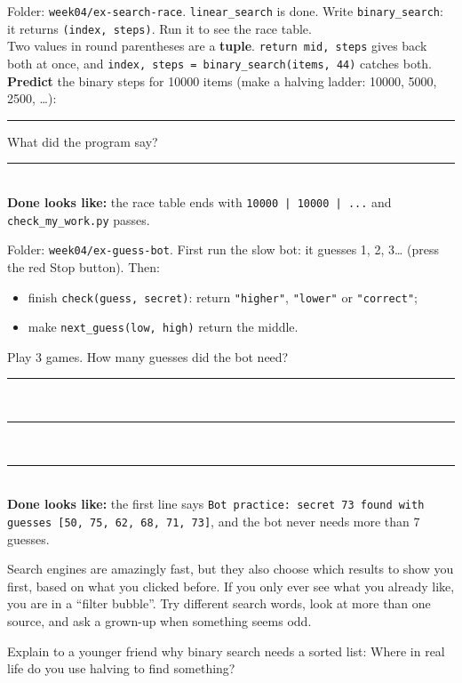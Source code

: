 \begin{exercise}
Folder: \texttt{week04/ex-search-race}. \texttt{linear\_search} is done. Write \texttt{binary\_search}: it returns \texttt{(index, steps)}. Run it to see the race table.\\
Two values in round parentheses are a \textbf{tuple}. \texttt{return mid, steps} gives back both at once, and \texttt{index, steps = binary\_search(items, 44)} catches both.\\
\textbf{Predict} the binary steps for 10000 items (make a halving ladder: 10000, 5000, 2500, \ldots): \rule{2cm}{0.4pt}\quad What did the program say? \rule{2cm}{0.4pt}\\
\textbf{Done looks like:} the race table ends with \texttt{10000 | 10000 | ...} and \texttt{check\_my\_work.py} passes.
\end{exercise}

\begin{exercise}
Folder: \texttt{week04/ex-guess-bot}. First run the slow bot: it guesses 1, 2, 3\ldots{} (press the red Stop button). Then:
\begin{itemize}[itemsep=1pt]
  \item finish \texttt{check(guess, secret)}: return \texttt{"higher"}, \texttt{"lower"} or \texttt{"correct"};
  \item make \texttt{next\_guess(low, high)} return the middle.
\end{itemize}
Play 3 games. How many guesses did the bot need? \rule{1.5cm}{0.4pt}\ \rule{1.5cm}{0.4pt}\ \rule{1.5cm}{0.4pt}\\
\textbf{Done looks like:} the first line says \texttt{Bot practice: secret 73 found with guesses [50, 75, 62, 68, 71, 73]}, and the bot never needs more than 7 guesses.
\end{exercise}

\begin{tip}
Search engines are amazingly fast, but they also choose which results to show you first, based on what you clicked before. If you only ever see what you already like, you are in a \enquote{filter bubble}. Try different search words, look at more than one source, and ask a grown-up when something seems odd.
\end{tip}

\begin{vocab}
\end{vocab}

\begin{reflection}
Explain to a younger friend why binary search needs a sorted list:
Where in real life do you use halving to find something?
\end{reflection}
